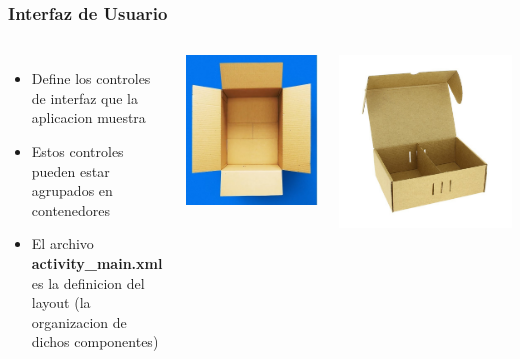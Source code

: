 \begin{frame}
\frametitle{Interfaz de Usuario}  

\begin{columns}

\begin{itemize}
\item Define los controles de interfaz que la aplicacion muestra
\item Estos controles pueden estar agrupados en contenedores
\item El archivo \textbf{activity\_main.xml} es la definicion del layout (la organizacion de dichos componentes)
\end{itemize}

\begin{columns}
\begin{center}
\includegraphics[width=0.75\linewidth]{01_Modificacion/CajaContenedora.png}    
\end{center}
\begin{center}
\includegraphics[width=0.75\linewidth]{01_Modificacion/Divisiones.jpg}    
\end{center}
\end{columns}


\end{columns}
\end{frame}
